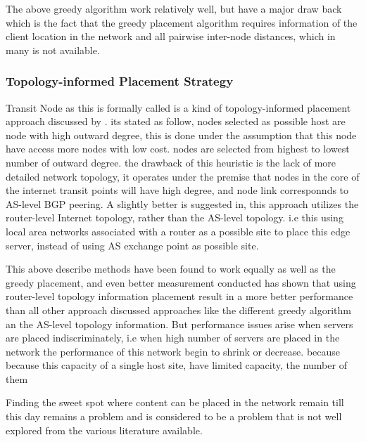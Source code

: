 The above greedy algorithm work relatively well, but have a major draw back which is the fact that the greedy placement algorithm requires information of the client location in the network and all pairwise inter-node distances, which in many is not available. 

\subsubsection{Topology-informed Placement Strategy}
Transit Node as this is formally called is a kind of topology-informed placement approach discussed by \cite{jaminconstrained}. its stated as follow, nodes selected as possible host are node with high outward degree, this is done under the assumption that this node have access more nodes with low cost. nodes are selected from highest to lowest number of outward degree. the drawback of this heuristic is the lack of more detailed network topology, it operates under the premise that nodes in the core of the internet transit points will have high degree, and node link corresponnds to AS-level BGP peering.  A slightly better is suggested in\cite{radoslavovtopology}, this approach utilizes the router-level Internet topology, rather than the AS-level topology. i.e this using local area networks associated with a router as a possible site to place this edge server, instead of using AS exchange point as possible site. 

This above describe methods have been found to work equally as well as the greedy placement, and even better measurement conducted has shown that using router-level topology information placement result in a more better performance than all other approach discussed approaches like the different greedy algorithm an the AS-level topology information. But performance issues arise when servers are placed indiscriminately, i.e when high number of servers are placed in the network the performance of this network begin to shrink or decrease. because 
because this capacity of a single host site, have limited capacity, the number of them

Finding the sweet spot where content can be placed in the network remain till this day remains a problem and is considered to be a problem that is not well explored from the various literature available. 	



